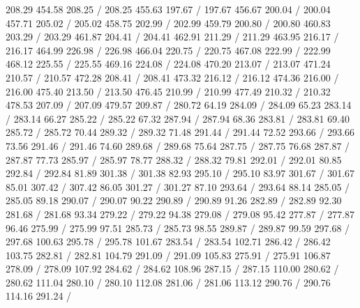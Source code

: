 { 208.29 454.58 208.25 /
 208.25 455.63 197.67 /
 197.67 456.67 200.04 /
 200.04 457.71 205.02 /
 205.02 458.75 202.99 /
 202.99 459.79 200.80 /
 200.80 460.83 203.29 /
 203.29 461.87 204.41 /
 204.41 462.91 211.29 /
 211.29 463.95 216.17 /
 216.17 464.99 226.98 /
 226.98 466.04 220.75 /
 220.75 467.08 222.99 /
 222.99 468.12 225.55 /
 225.55 469.16 224.08 /
 224.08 470.20 213.07 /
 213.07 471.24 210.57 /
 210.57 472.28 208.41 /
 208.41 473.32 216.12 /
 216.12 474.36 216.00 /
 216.00 475.40 213.50 /
 213.50 476.45 210.99 /
 210.99 477.49 210.32 /
 210.32 478.53 207.09 /
 207.09 479.57 209.87 /
\setsolid
{} 280.72 64.19 284.09 /
 284.09 65.23 283.14 /
 283.14 66.27 285.22 /
 285.22 67.32 287.94 /
 287.94 68.36 283.81 /
 283.81 69.40 285.72 /
 285.72 70.44 289.32 /
 289.32 71.48 291.44 /
 291.44 72.52 293.66 /
 293.66 73.56 291.46 /
 291.46 74.60 289.68 /
 289.68 75.64 287.75 /
 287.75 76.68 287.87 /
 287.87 77.73 285.97 /
 285.97 78.77 288.32 /
 288.32 79.81 292.01 /
 292.01 80.85 292.84 /
 292.84 81.89 301.38 /
 301.38 82.93 295.10 /
 295.10 83.97 301.67 /
 301.67 85.01 307.42 /
 307.42 86.05 301.27 /
 301.27 87.10 293.64 /
 293.64 88.14 285.05 /
 285.05 89.18 290.07 /
 290.07 90.22 290.89 /
 290.89 91.26 282.89 /
 282.89 92.30 281.68 /
 281.68 93.34 279.22 /
 279.22 94.38 279.08 /
 279.08 95.42 277.87 /
 277.87 96.46 275.99 /
 275.99 97.51 285.73 /
 285.73 98.55 289.87 /
 289.87 99.59 297.68 /
 297.68 100.63 295.78 /
 295.78 101.67 283.54 /
 283.54 102.71 286.42 /
 286.42 103.75 282.81 /
 282.81 104.79 291.09 /
 291.09 105.83 275.91 /
 275.91 106.87 278.09 /
 278.09 107.92 284.62 /
 284.62 108.96 287.15 /
 287.15 110.00 280.62 /
 280.62 111.04 280.10 /
 280.10 112.08 281.06 /
 281.06 113.12 290.76 /
 290.76 114.16 291.24 /
}
